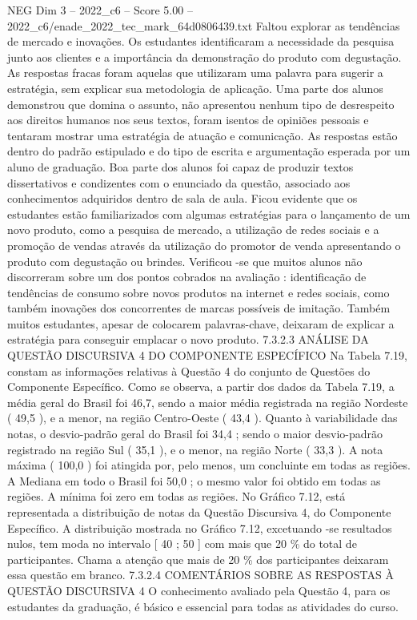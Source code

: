 \begin{textsample}{NEG Dim 3 – 2022\_c6 – Score 5.00 – 2022\_c6/enade\_2022\_tec\_mark\_64d0806439.txt}
Faltou explorar as tendências de mercado e inovações.
Os estudantes identificaram a necessidade da pesquisa junto aos clientes e a importância da demonstração do produto com degustação.
As respostas fracas foram aquelas que utilizaram uma palavra para sugerir a estratégia, sem explicar sua metodologia de aplicação.
Uma parte dos alunos demonstrou que domina o assunto, não apresentou nenhum tipo de desrespeito aos direitos humanos nos seus textos, foram isentos de opiniões pessoais e tentaram mostrar uma estratégia de atuação e comunicação.
As respostas estão dentro do padrão estipulado e do tipo de escrita e argumentação esperada por um aluno de graduação.
Boa parte dos alunos foi capaz de produzir textos dissertativos e condizentes com o enunciado da questão, associado aos conhecimentos adquiridos dentro de sala de aula.
Ficou evidente que os estudantes estão familiarizados com algumas estratégias para o lançamento de um novo produto, como a pesquisa de mercado, a utilização de redes sociais e a promoção de vendas através da utilização do promotor de venda apresentando o produto com degustação ou brindes.
Verificou -se que muitos alunos não discorreram sobre um dos pontos cobrados na avaliação : identificação de tendências de consumo sobre novos produtos na internet e redes sociais, como também inovações dos concorrentes de marcas possíveis de imitação.
Também muitos estudantes, apesar de colocarem palavras-chave, deixaram de explicar a estratégia para conseguir emplacar o novo produto. 7.3.2.3 ANÁLISE DA QUESTÃO DISCURSIVA 4 DO COMPONENTE ESPECÍFICO Na Tabela 7.19, constam as informações relativas à Questão 4 do conjunto de Questões do Componente Específico.
Como se observa, a partir dos dados da Tabela 7.19, a média geral do Brasil foi 46,7, sendo a maior média registrada na região Nordeste ( 49,5 ), e a menor, na região Centro-Oeste ( 43,4 ).
Quanto à variabilidade das notas, o desvio-padrão geral do Brasil foi 34,4 ; sendo o maior desvio-padrão registrado na região Sul ( 35,1 ), e o menor, na região Norte ( 33,3 ).
A nota máxima ( 100,0 ) foi atingida por, pelo menos, um concluinte em todas as regiões.
A Mediana em todo o Brasil foi 50,0 ; o mesmo valor foi obtido em todas as regiões.
A mínima foi zero em todas as regiões.
No Gráfico 7.12, está representada a distribuição de notas da Questão Discursiva 4, do Componente Específico.
A distribuição mostrada no Gráfico 7.12, excetuando -se resultados nulos, tem moda no intervalo [ 40 ; 50 ] com mais que 20 \% do total de participantes.
Chama a atenção que mais de 20 \% dos participantes deixaram essa questão em branco. 7.3.2.4 COMENTÁRIOS SOBRE AS RESPOSTAS À QUESTÃO DISCURSIVA 4 O conhecimento avaliado pela Questão 4, para os estudantes da graduação, é básico e essencial para todas as atividades do curso.

\end{textsample}
